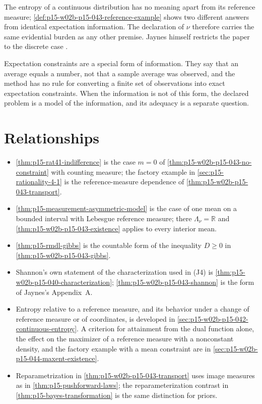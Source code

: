 The entropy of a continuous distribution has no meaning apart from its
reference measure; \cref{def:p15-w02b-p15-043-reference-example} shows two
different answers from identical expectation information. The declaration of
\(\nu\) therefore carries the same evidential burden as any other premise.
Jaynes himself restricts the paper to the discrete case
\cite[p.~622, n.~6]{Jaynes1957InformationTheory}.

Expectation constraints are a special form of information. They say that an
average equals a number, not that a sample average was observed, and the
method has no rule for converting a finite set of observations into exact
expectation constraints. When the information is not of this form, the
declared problem is a model of the information, and its adequacy is a
separate question.

\section{Relationships}
\label{sec:p15-w02b-p15-043-relations}

\begin{itemize}
\item \cref{thm:p15-rat41-indifference} is the case \(m=0\) of
\cref{thm:p15-w02b-p15-043-no-constraint} with counting measure; the factory
example in \cref{sec:p15-rationality-4-1} is the reference-measure dependence of
\cref{thm:p15-w02b-p15-043-transport}.
\item \cref{thm:p15-measurement-asymmetric-model} is the case of one mean on a
bounded interval with Lebesgue reference measure; there \(\Lambda_\nu=\mathbb R\)
and \cref{thm:p15-w02b-p15-043-existence} applies to every interior mean.
\item \cref{thm:p15-rmdl-gibbs} is the countable form of the inequality
\(D\geq0\) in \cref{thm:p15-w02b-p15-043-gibbs}.
\item Shannon's own statement of the characterization used in (J4) is
\cref{thm:p15-w02b-p15-040-characterization};
\cref{thm:p15-w02b-p15-043-shannon} is the form of Jaynes's Appendix~A.
\item Entropy relative to a reference measure, and its behavior under a change
of reference measure or of coordinates, is developed in
\cref{sec:p15-w02b-p15-042-continuous-entropy}. A criterion for attainment from
the dual function alone, the effect on the maximizer of a reference measure with
a nonconstant density, and the factory example with a mean constraint are in
\cref{sec:p15-w02b-p15-044-maxent-existence}.
\item Reparametrization in \cref{thm:p15-w02b-p15-043-transport} uses image
measures as in \cref{thm:p15-pushforward-laws}; the reparameterization contrast in
\cref{thm:p15-bayes-transformation} is the same distinction for priors.
\end{itemize}

